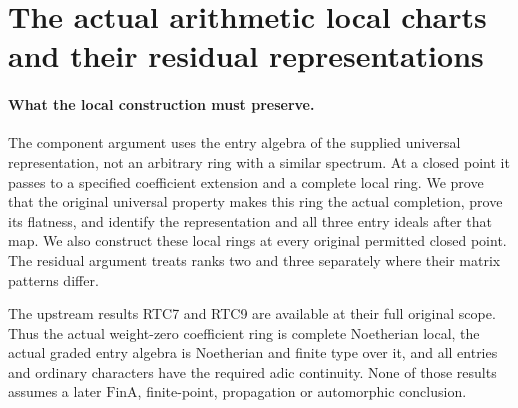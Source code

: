 \documentclass[11pt,a4paper]{article}
\numberwithin{equation}{section}
\theoremstyle{remark}\newtheorem{remark}[theorem]{Remark}
\begin{document}
\section{The actual arithmetic local charts and their residual representations}
\label{sec:arithmetic-local-charts-v055}

\paragraph{What the local construction must preserve.}
The component argument uses the entry algebra of the supplied universal
representation, not an arbitrary ring with a similar spectrum.  At a
closed point it passes to a specified coefficient extension and a
complete local ring.  We prove that the original universal property
makes this ring the actual completion, prove its flatness, and identify
the representation and all three entry ideals after that map.  We also
construct these local rings at every original permitted closed point.
The residual argument treats ranks two and three separately where
their matrix patterns differ.

The upstream results RTC7 and RTC9 are available at their full original
scope.  Thus the actual weight-zero coefficient ring is complete
Noetherian local, the actual graded entry algebra is Noetherian and
finite type over it, and all entries and ordinary characters have the
required adic continuity.  None of those results assumes a later
\(\mathrm{FinA}\), finite-point, propagation or automorphic conclusion.
\end{document}
